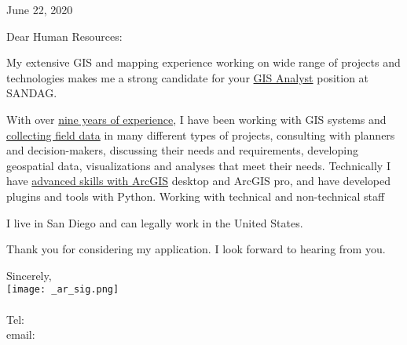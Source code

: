 \documentclass[letterpaper]{article}
\newcommand{\impt}[1]{\uline{#1}}
\newcommand{\CVjobTitle}{GIS Analyst}
\newcommand{\CVcompany}{SANDAG}
\begin{document}
\large

\null\hfill June 22, 2020
\vspace{1em}

Dear Human Resources:

My extensive GIS and mapping experience working on wide range of projects and
technologies makes me a strong candidate for your \impt{\CVjobTitle} position
at \CVcompany.

With over \impt{nine years of experience}, I have been working with GIS systems
and \impt{collecting field data} in many different types of
projects, consulting with planners and decision-makers, discussing their needs and
requirements, developing geospatial data, visualizations and analyses that meet
their needs.  
Technically I have \impt{advanced skills with ArcGIS}
desktop and ArcGIS pro, and have developed plugins and tools with Python.
Working with technical and non-technical staff 

I live in San Diego and can legally work in the United States.  

Thank you for considering my application.
I look forward to hearing from you.  


Sincerely,\\
    \hspace{1em} 
    \texttt{[image: \_ar\_sig.png]} \\
    \CVname \\
    \small
    Tel: \CVphone \\
    email: \CVemail
\end{document}
